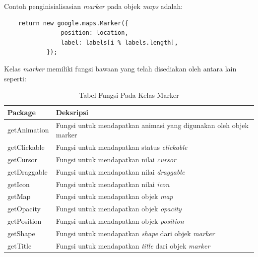 Contoh penginisialisasian \textit{marker} pada  objek \textit{maps} adalah:
\begin{lstlisting}
    return new google.maps.Marker({
                position: location,
                label: labels[i % labels.length],
            });
\end{lstlisting}
Kelas \textit{marker} memiliki fungsi bawaan yang telah disediakan oleh antara lain seperti:
\begin{table}[H] 
	\centering 
	\caption{Tabel Fungsi Pada Kelas Marker}
	\label{tab:radioPackages}
	\begin{tabular}{|p{8cm}|p{8cm}|}
	\hline
		Package & Deksripsi \\
    \hline
		getAnimation & Fungsi untuk mendapatkan animasi yang digunakan oleh objek marker \\
		getClickable  & Fungsi untuk mendapatkan status \textit{clickable} \\
		getCursor  & Fungsi untuk mendapatkan nilai \textit{cursor} \\
		getDraggable  & Fungsi untuk mendapatkan nilai \textit{draggable} \\
		getIcon  & Fungsi untuk mendapatkan nilai \textit{icon} \\
		getMap  & Fungsi untuk mendapatkan objek \textit{map} \\
		getOpacity  & Fungsi untuk mendapatkan objek \textit{opacity} \\
		getPosition  & Fungsi untuk mendapatkan objek \textit{position} \\
		getShape  & Fungsi untuk mendapatkan \textit{shape} dari objek \textit{marker} \\
		getTitle  & Fungsi untuk mendapatkan \textit{title} dari objek \textit{marker} \\
		\hline
	\end{tabular} 
\end{table}



